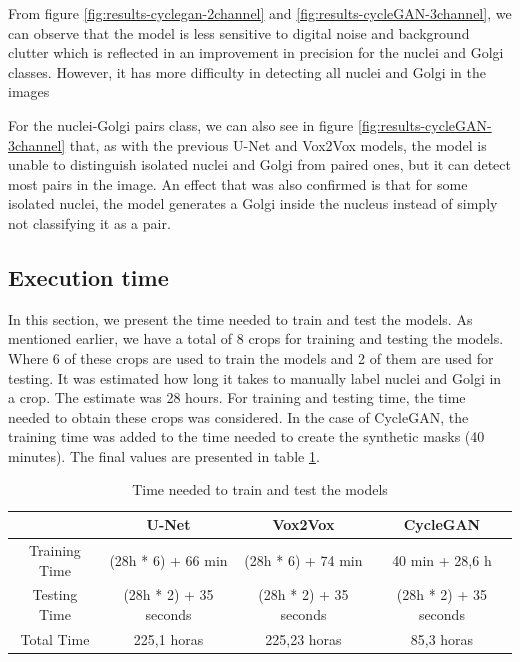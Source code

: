 From figure \ref{fig:results-cyclegan-2channel} and \ref{fig:results-cycleGAN-3channel}, we can observe that the model is less sensitive to digital noise and background clutter which is reflected in an improvement in precision for the nuclei and Golgi classes. However, it has more difficulty in detecting all nuclei and Golgi in the images 

For the nuclei-Golgi pairs class, we can also see in figure \ref{fig:results-cycleGAN-3channel} that, as with the previous U-Net and Vox2Vox models, the model is unable to distinguish isolated nuclei and Golgi from paired ones, but it can detect most pairs in the image. An effect that was also confirmed is that for some isolated nuclei, the model generates a Golgi inside the nucleus instead of simply not classifying it as a pair.

\subsection{Execution time}
\label{subsection:execution-time}

In this section, we present the time needed to train and test the models. As mentioned earlier, we have a total of 8 crops for training and testing the models. Where 6 of these crops are used to train the models and 2 of them are used for testing. It was estimated how long it takes to manually label nuclei and Golgi in a crop. The estimate was 28 hours. For training and testing time, the time needed to obtain these crops was considered. In the case of CycleGAN, the training time was added to the time needed to create the synthetic masks (40 minutes). The final values are presented in table \ref{tab:time}.

\begin{table}[!htb]
\centering
\caption{Time needed to train and test the models}
\label{tab:time}
\renewcommand\arraystretch{1.4}
\begin{tabular}{c|c|c|c|}
\cline{2-4}
                                    & U-Net                  & Vox2Vox                & CycleGAN               \\ \hline
\multicolumn{1}{|c|}{Training Time} & (28h * 6) + 66 min     & (28h * 6) + 74 min     & 40 min + 28,6 h        \\ \hline
\multicolumn{1}{|c|}{Testing Time}  & (28h * 2) + 35 seconds & (28h * 2) + 35 seconds & (28h * 2) + 35 seconds \\ \hline
\multicolumn{1}{|c|}{Total Time}    & 225,1 horas            & 225,23 horas           & 85,3 horas             \\ \hline
\end{tabular}
\end{table}



